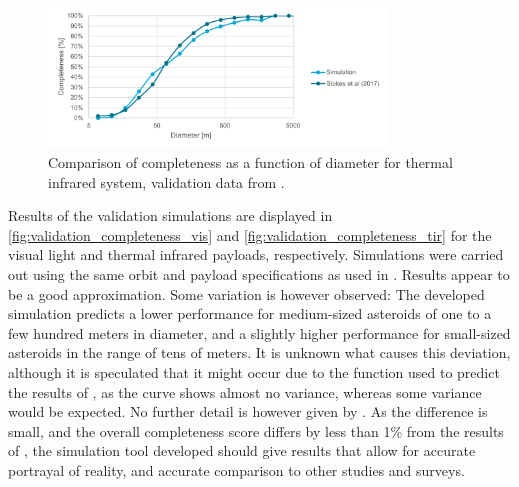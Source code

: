 \begin{figure}[htbp]
 \centering
 \includegraphics[width=0.8\textwidth]{img/validation_completeness_tir.pdf}
 \caption{Comparison of completeness as a function of diameter for thermal infrared system, validation data from \cite{2017NEOSDT}.}
 \label{fig:validation_completeness_tir}
\end{figure}

Results of the validation simulations are displayed in \autoref{fig:validation_completeness_vis} and \autoref{fig:validation_completeness_tir} for the visual light and thermal infrared payloads, respectively. Simulations were carried out using the same orbit and payload specifications as used in \cite{2017NEOSDT}. Results appear to be a good approximation. Some variation is however observed: The developed simulation predicts a lower performance for medium-sized asteroids of one to a few hundred meters in diameter, and a slightly higher performance for small-sized asteroids in the range of tens of meters. It is unknown what causes this deviation, although it is speculated that it might occur due to the function used to predict the results of \cite{2017NEOSDT}, as the curve shows almost no variance, whereas some variance would be expected. No further detail is however given by \cite{2017NEOSDT}. As the difference is small, and the overall completeness score differs by less than 1\% from the results of \cite{2017NEOSDT}, the simulation tool developed should give results that allow for accurate portrayal of reality, and accurate comparison to other studies and surveys.
